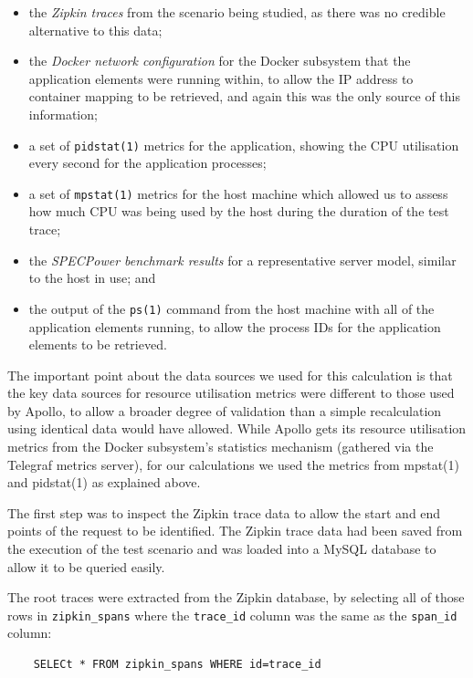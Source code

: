 \begin{itemize}
	\item the \emph{Zipkin traces} from the scenario being studied, as there was no credible alternative to this data;
	\item the \emph{Docker network configuration} for the Docker subsystem that the application elements were running within, to allow the IP address to container mapping to be retrieved, and again this was the only source of this information;
	\item a set of \texttt{pidstat(1)} metrics for the application, showing the CPU utilisation every second for the application processes;
	\item a set of \texttt{mpstat(1)} metrics for the host machine which allowed us to assess how much CPU was being used by the host during the duration of the test trace;
	\item the \emph{SPECPower benchmark results} for a representative server model, similar to the host in use; and
	\item the output of the \texttt{ps(1)} command from the host machine with all of the application elements running, to allow the process IDs for the application elements to be retrieved.
\end{itemize}

The important point about the data sources we used for this calculation is that the key data sources for resource utilisation metrics were different to those used by Apollo, to allow a broader degree of validation than a simple recalculation using identical data would have allowed.  While Apollo gets its resource utilisation metrics from the Docker subsystem's statistics mechanism (gathered via the Telegraf metrics server), for our calculations we used the metrics from mpstat(1) and pidstat(1) as explained above.

The first step was to inspect the Zipkin trace data to allow the start and end points of the request to be identified.  The Zipkin trace data had been saved from the execution of the test scenario and was loaded into a MySQL database to allow it to be queried easily.

The root traces were extracted from the Zipkin database, by selecting all of those rows in \texttt{zipkin\_spans} where the \texttt{trace\_id} column was the same as the \texttt{span\_id} column:

\lstset{language=SQL}
\begin{lstlisting}
	SELECt * FROM zipkin_spans WHERE id=trace_id
\end{lstlisting}


